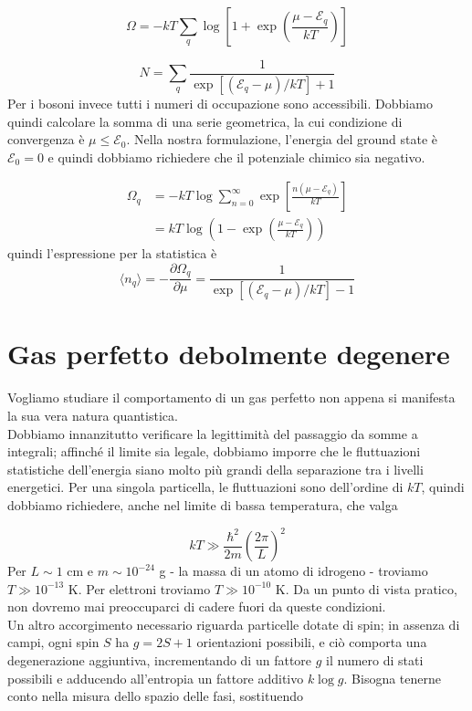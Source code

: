 \documentclass[a4paper]{report}
\begin{document}
\begin{equation}
    \Omega = - k T \sum_q \log \left[1+\exp\left(\frac{\mu-\mathcal{E}_q}{k T}\right)\right]
    \label{omegafermidirac}
\end{equation}

\begin{equation}
    N = \sum_q \frac{1}{\exp[(\mathcal{E}_q-\mu)/k T]+1}
\end{equation}
Per i bosoni invece tutti i numeri di occupazione sono accessibili. Dobbiamo quindi calcolare la somma di una serie geometrica, la cui condizione di convergenza è $\mu \leq \mathcal{E}_0$. Nella nostra formulazione, l'energia del ground state è $\mathcal{E}_0 = 0$ e quindi dobbiamo richiedere che il potenziale chimico sia negativo.

\begin{equation}
\begin{split}
    \Omega_q & = -k T \log \sum_{n=0}^{\infty} \exp \left[\frac{n(\mu -\mathcal{E}_q)}{k T}\right] \\
    & = k T \log \left(1-\exp\left(\frac{\mu - \mathcal{E}_q}{k T}\right)\right)
\end{split}
\label{omegaboseeinstein}
\end{equation}
quindi l'espressione  per la statistica è
\begin{equation}
        \langle n_q \rangle  = -\frac{\partial \Omega_q}{\partial \mu} 
         = \frac{1}{\exp[(\mathcal{E}_q-\mu)/k T]-1}
    \label{bose-einstein}
\end{equation}

\section{Gas perfetto debolmente degenere}

Vogliamo studiare il comportamento di un gas perfetto non appena si manifesta la sua vera natura quantistica. \\
Dobbiamo innanzitutto verificare la legittimità del passaggio da somme a integrali; affinché il limite sia legale, dobbiamo imporre che le fluttuazioni statistiche dell'energia siano molto più grandi della separazione tra i livelli energetici. Per una singola particella, le fluttuazioni sono dell'ordine di $k T$, quindi dobbiamo richiedere, anche nel limite di bassa temperatura, che valga

\begin{equation}
    k T \gg \frac{\hbar^2}{2m}\left(\frac{2\pi}{L}\right)^2
\end{equation}
Per $L \sim 1$ cm e $m \sim 10^{-24}$ g - la massa di un atomo di idrogeno - troviamo $T \gg 10^{-13}$ K. Per elettroni troviamo $T \gg 10^{-10}$ K. Da un punto di vista pratico, non dovremo mai preoccuparci di cadere fuori da queste condizioni. \\
Un altro accorgimento necessario riguarda particelle dotate di spin; in assenza di campi, ogni spin $S$ ha $g = 2S+1$ orientazioni possibili, e ciò comporta una degenerazione aggiuntiva, incrementando di un fattore $g$ il numero di stati possibili e adducendo all'entropia un fattore additivo $k \log g$. Bisogna tenerne conto nella misura dello spazio delle fasi, sostituendo
\end{document}

